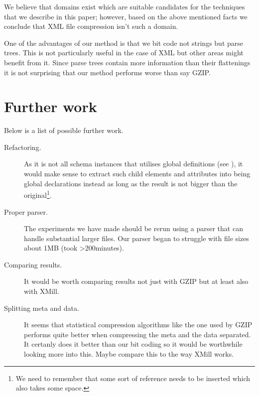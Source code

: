 \documentclass[a4paper, oneside]{memoir}
\let\fref\undefined
\theoremstyle{definition}
\begin{document}
We believe that domains exist which are suitable candidates for the techniques
that we describe in this paper; however, based on the above mentioned facts we
conclude that XML file compression isn't such a domain.

One of the advantages of our method is that we bit code not strings but parse
trees. This is not particularly useful in the case of XML but other areas might
benefit from it. Since parse trees contain more information than their
flattenings it is not surprising that our method performs worse than say GZIP.

\section{Further work}

Below is a list of possible further work.

\begin{description}
\item[Refactoring.] As it is not all schema instances that utilises global
  definitions (see \fref{sec:local-global-schema-definitions}), it would make
  sense to extract such child elements and attributes into being global
  declarations instead as long as the result is not bigger than the
  original\footnote{We need to remember that some sort of reference needs to be inserted
    which also takes some space.}.


\item[Proper parser.] The experiments we have made should be rerun using a
  parser that can handle substantial larger files. Our parser began to struggle
  with file sizes about 1MB (took >200minutes).

\item[Comparing results.] It would be worth comparing results not just with GZIP
  but at least also with XMill\cite{lisu2000}.

\item [Splitting meta and data.] It seems that statistical compression
  algorithms like the one used by GZIP performs quite better when compressing
  the meta and the data separated. It certanly does it better than our bit
  coding so it would be worthwhile looking more into this. Maybe compare this to
  the way XMill works.

\end{description}

\clearpage


% 

\end{document}
